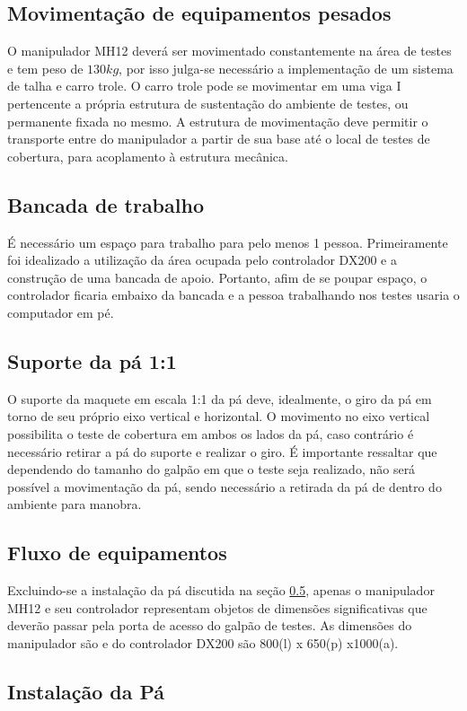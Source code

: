 \subsection{Movimentação de equipamentos pesados}
O manipulador MH12 deverá ser movimentado constantemente na área de testes e tem
peso de $130kg$, por isso julga-se necessário a implementação de um sistema de
talha e carro trole. O carro trole pode se movimentar em uma viga I pertencente
a própria estrutura de sustentação do ambiente de testes, ou permanente fixada
no mesmo. A estrutura de movimentação deve permitir o transporte entre do
manipulador a partir de sua base até o local de testes de cobertura, para
acoplamento à estrutura mecânica.


\subsection{Bancada de trabalho}
É necessário um espaço para trabalho para pelo menos 1 pessoa.
Primeiramente foi idealizado a utilização da área ocupada pelo controlador DX200
e a construção de uma bancada de apoio. 
Portanto, afim de se poupar espaço, o
controlador ficaria embaixo da bancada e a pessoa trabalhando nos testes usaria
o computador em pé.

 \subsection{Suporte da pá 1:1}
 O suporte da maquete em escala 1:1 da pá deve, idealmente, o giro da pá em
 torno de seu próprio eixo vertical e horizontal. 
 O movimento no eixo vertical possibilita o teste de cobertura em ambos os lados
 da pá, caso contrário é necessário retirar a pá do suporte e realizar o giro.
 É importante ressaltar que dependendo do tamanho do galpão em que o teste seja
 realizado, não será possível a movimentação da pá, sendo necessário a retirada
 da pá de dentro do ambiente para manobra.
 
 \subsection{Fluxo de equipamentos}
 Excluindo-se a instalação da pá discutida na seção \ref{sec::instal_pa}, apenas
o manipulador MH12 e seu controlador representam objetos de dimensões
significativas que deverão passar pela porta de acesso do galpão de testes.
As dimensões do manipulador são e do controlador DX200 são 800(l)   x  650(p) 
x1000(a). 


\subsection{Instalação da Pá}\label{sec::instal_pa}

